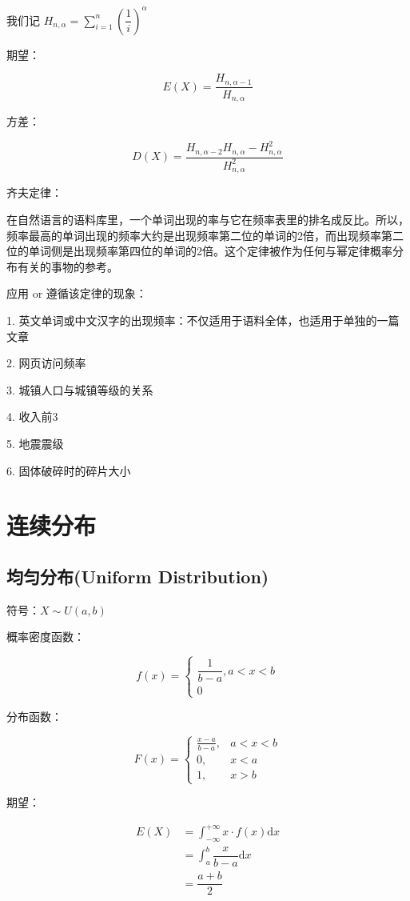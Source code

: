 \documentclass[12pt, a4paper, oneside]{ctexbook}
\begin{document}
我们记 $H_{n, \alpha} = \sum\limits_{i = 1}^{n} \left(\dfrac{1}{i}\right)^{\alpha}$

 期望：

$$
E(X) = \dfrac{H_{n, \alpha - 1}}{H_{n, \alpha}}
$$

 方差：

$$
D(X) = \dfrac{H_{n, \alpha - 2}H_{n, \alpha} - H_{n, \alpha}^{2}}{H_{n, \alpha}^{2}}
$$

 齐夫定律：

在自然语言的语料库里，一个单词出现的率与它在频率表里的排名成反比。所以，频率最高的单词出现的频率大约是出现频率第二位的单词的2倍，而出现频率第二位的单词侧是出现频率第四位的单词的2倍。这个定律被作为任何与幂定律概率分布有关的事物的参考。

 应用 or 遵循该定律的现象：

1. 英文单词或中文汉字的出现频率：不仅适用于语料全体，也适用于单独的一篇文章

2. 网页访问频率

3. 城镇人口与城镇等级的关系

4. 收入前3%

5. 地震震级

6. 固体破碎时的碎片大小

\chapter{连续分布}

\section{均匀分布(Uniform Distribution)}

 符号：$X \sim U(a, b)$
 
 概率密度函数：

$$
f(x) = \begin{cases} \dfrac{1}{b - a} , a < x < b \\
0\end{cases}
$$

 分布函数：

$$
F(x) = \begin{cases}
\frac{x - a}{b - a}, &a < x < b \\
0,&x < a \\
1,&x > b
\end{cases}
$$

 期望：

$$
\begin{aligned}
E(X) &= \int_{-\infty}^{+\infty} x \cdot f(x) \mathrm{d}x \\
&= \int_{a}^{b} \dfrac{x}{b - a} \mathrm{d}x \\
&= \dfrac{a + b}{2}
\end{aligned}
$$
\end{document}
